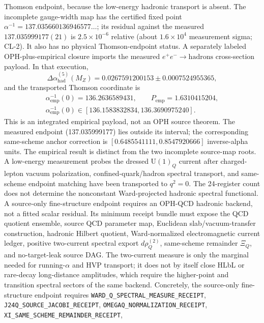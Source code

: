 \documentclass[11pt]{article}
\newcommand{\U}{\mathrm{U}}
\begin{document}
Thomson endpoint, because the low-energy hadronic transport is absent.
The incomplete gauge-width map has the certified fixed point
\(\alpha^{-1}=137.035660136946577\ldots\); its residual against the measured
\(137.035999177(21)\) is \(2.5\times10^{-6}\) relative (about \(1.6\times10^{4}\)
measurement sigma; CL-2). It also has no physical Thomson-endpoint status.
A separately labeled OPH-plus-empirical closure imports the measured
\(e^+e^-\!\to\mathrm{hadrons}\) cross-section payload.  In that execution,
\[
\Delta\alpha_{\mathrm{had}}^{(5)}(M_Z)
=0.0267591200153\pm0.0007524955365,
\]
and the transported Thomson coordinate is
\[
\begin{gathered}
\alpha_{\mathrm{emp}}^{-1}(0)=136.2636589431,
\qquad
P_{\mathrm{emp}}=1.6310415204,\\
\alpha_{\mathrm{emp}}^{-1}(0)\in
[136.1583832834,136.3690975240].
\end{gathered}
\]
This is an integrated empirical payload, not an OPH source theorem. The
measured endpoint (137.035999177) lies outside its interval; the corresponding
same-scheme anchor correction is
\([0.6485541111,0.8547920666]\) inverse-alpha units. The empirical result is
distinct from the two incomplete source-map roots.
A low-energy
measurement probes the dressed \(\U(1)_Q\) current after charged-lepton vacuum
polarization, confined-quark/hadron spectral transport, and same-scheme endpoint
matching have been transported to \(q^2=0\). The 24-register count
does not determine the nonconstant Ward-projected hadronic spectral functional.
A source-only fine-structure endpoint requires an OPH-QCD hadronic backend, not
a fitted scalar residual. Its minimum receipt bundle must expose the QCD
quotient ensemble, source QCD parameter map, Euclidean slab/vacuum-transfer
construction, hadronic Hilbert quotient, Ward-normalized electromagnetic current
ledger, positive two-current spectral export \(d\rho_Q^{(2)}\), same-scheme
remainder \(\Xi_Q\), and no-target-leak source DAG. The two-current measure is
only the marginal needed for running-\(\alpha\) and HVP transport; it does not
by itself close HLbL or rare-decay long-distance amplitudes, which require the
higher-point and transition spectral sectors of the same backend. Concretely,
the source-only fine-structure endpoint requires
\texttt{WARD\_\allowbreak Q\_\allowbreak SPECTRAL\_\allowbreak MEASURE\_\allowbreak RECEIPT},
\texttt{J24Q\_\allowbreak SOURCE\_\allowbreak JACOBI\_\allowbreak RECEIPT},
\texttt{OMEGAQ\_\allowbreak NORMALIZATION\_\allowbreak RECEIPT},
\texttt{XI\_\allowbreak SAME\_\allowbreak SCHEME\_\allowbreak REMAINDER\_\allowbreak RECEIPT},
\end{document}
